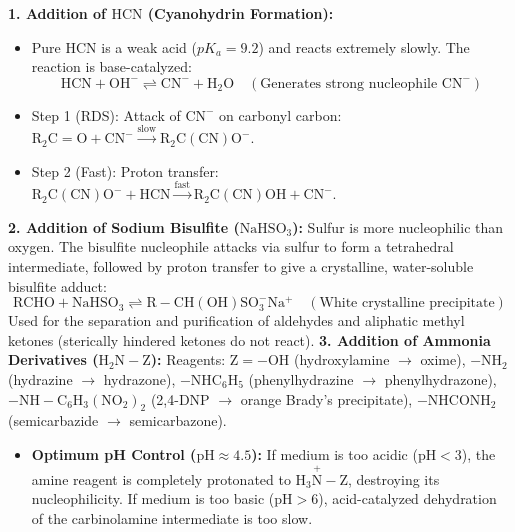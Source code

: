 \documentclass[10pt,a4paper]{article}
\begin{document}
\begin{formulabox}
\textbf{1. Addition of $\mathrm{HCN}$ (Cyanohydrin Formation):}
\begin{itemize}
  \item Pure $\mathrm{HCN}$ is a weak acid ($pK_a = 9.2$) and reacts extremely slowly. The reaction is base-catalyzed:
  \begin{equation}
    \mathrm{HCN} + \mathrm{OH^-} \rightleftharpoons \mathrm{CN^-} + \mathrm{H_2O} \quad (\text{Generates strong nucleophile } \mathrm{CN^-})
  \end{equation}
  \item Step 1 (RDS): Attack of $\mathrm{CN^-}$ on carbonyl carbon: $\mathrm{R_2C=O} + \mathrm{CN^-} \xrightarrow{\text{slow}} \mathrm{R_2C(CN)O^-}$.
  \item Step 2 (Fast): Proton transfer: $\mathrm{R_2C(CN)O^-} + \mathrm{HCN} \xrightarrow{\text{fast}} \mathrm{R_2C(CN)OH} + \mathrm{CN^-}$.
\end{itemize}
\textbf{2. Addition of Sodium Bisulfite ($\mathrm{NaHSO_3}$):}
Sulfur is more nucleophilic than oxygen. The bisulfite nucleophile attacks via sulfur to form a tetrahedral intermediate, followed by proton transfer to give a crystalline, water-soluble bisulfite adduct:
\begin{equation}
  \mathrm{RCHO} + \mathrm{NaHSO_3} \rightleftharpoons \mathrm{R-CH(OH)SO_3^-Na^+} \quad (\text{White crystalline precipitate})
\end{equation}
Used for the separation and purification of aldehydes and aliphatic methyl ketones (sterically hindered ketones do not react).
\textbf{3. Addition of Ammonia Derivatives ($\mathrm{H_2N-Z}$):}
Reagents: $\mathrm{Z = -OH}$ (hydroxylamine $\to$ oxime), $-\mathrm{NH_2}$ (hydrazine $\to$ hydrazone), $-\mathrm{NHC_6H_5}$ (phenylhydrazine $\to$ phenylhydrazone), $-\mathrm{NH-C_6H_3(NO_2)_2}$ (2,4-DNP $\to$ orange Brady's precipitate), $-\mathrm{NHCONH_2}$ (semicarbazide $\to$ semicarbazone).
\begin{itemize}
  \item \textbf{Optimum pH Control ($\mathrm{pH} \approx 4.5$):} If medium is too acidic ($\mathrm{pH} < 3$), the amine reagent is completely protonated to $\mathrm{H_3\overset{+}{N}-Z}$, destroying its nucleophilicity. If medium is too basic ($\mathrm{pH} > 6$), acid-catalyzed dehydration of the carbinolamine intermediate is too slow.
\end{itemize}
\end{formulabox}
\end{document}
